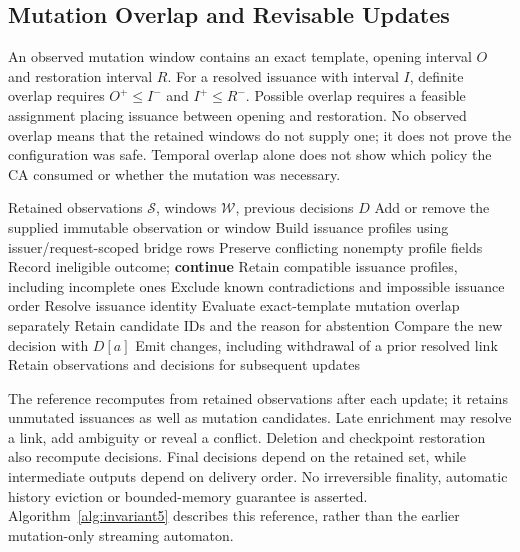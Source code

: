 \subsection{Mutation Overlap and Revisable Updates}
An observed mutation window contains an exact template, opening interval $O$ and restoration interval $R$. For a resolved issuance with interval $I$, definite overlap requires $O^+\le I^-$ and $I^+\le R^-$. Possible overlap requires a feasible assignment placing issuance between opening and restoration. No observed overlap means that the retained windows do not supply one; it does not prove the configuration was safe. Temporal overlap alone does not show which policy the CA consumed or whether the mutation was necessary.

\begin{algorithm}[H]
\caption{Current certificate-lineage reference update}
\label{alg:invariant5}
\footnotesize
\begin{algorithmic}[1]
\Require Retained observations $\mathcal S$, windows $\mathcal W$, previous decisions $D$
\State Add or remove the supplied immutable observation or window
\State Build issuance profiles using issuer/request-scoped bridge rows
\State Preserve conflicting nonempty profile fields
  \State Record ineligible outcome; \textbf{continue}
 \EndIf
 \State Retain compatible issuance profiles, including incomplete ones
 \State Exclude known contradictions and impossible issuance order
  \State Resolve issuance identity
  \State Evaluate exact-template mutation overlap separately
 \Else
  \State Retain candidate IDs and the reason for abstention
 \EndIf
 \State Compare the new decision with $D[a]$
 \State Emit changes, including withdrawal of a prior resolved link
\EndFor
\State Retain observations and decisions for subsequent updates
\end{algorithmic}
\end{algorithm}

The reference recomputes from retained observations after each update; it retains unmutated issuances as well as mutation candidates. Late enrichment may resolve a link, add ambiguity or reveal a conflict. Deletion and checkpoint restoration also recompute decisions. Final decisions depend on the retained set, while intermediate outputs depend on delivery order. No irreversible finality, automatic history eviction or bounded-memory guarantee is asserted. Algorithm~\ref{alg:invariant5} describes this reference, rather than the earlier mutation-only streaming automaton.

